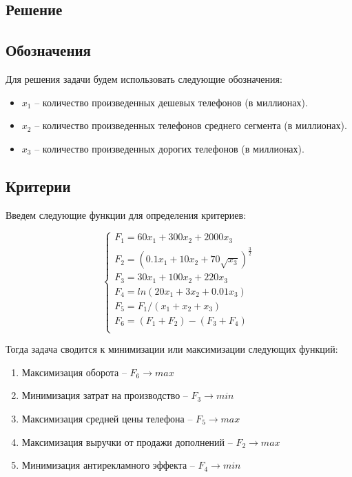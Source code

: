 \subsection{Решение}

\subsection{Обозначения}

Для решения задачи будем использовать следующие обозначения:

\begin{itemize}
	\item $x_1$ -- количество произведенных дешевых телефонов (в миллионах).
	\item $x_2$ -- количество произведенных телефонов среднего сегмента (в миллионах).
	\item $x_3$ -- количество произведенных дорогих телефонов (в миллионах).
\end{itemize}

\subsection{Критерии}

Введем следующие функции для определения критериев:

\begin{equation*}
\begin{cases}
\text{$F_1=60x_1+300x_2+2000x_3$} \\
\text{$F_2=(0.1x_1+10x_2+70\sqrt{x_3})^{\frac{3}{2}}$} \\
\text{$F_3=30x_1+100x_2+220x_3$} \\
\text{$F_4=ln(20x_1+3x_2+0.01x_3)$} \\
\text{$F_5=F_1/(x_1+x_2+x_3)$} \\
\text{$F_6=(F_1+F_2)-(F_3+F_4)$} \\
\end{cases}
\end{equation*}

Тогда задача сводится к минимизации или максимизации следующих функций:

\begin{enumerate}
	\item Максимизация оборота -- $F_6\rightarrow max$
	\item Минимизация затрат на производство -- $F_3\rightarrow min$
	\item Максимизация средней цены телефона -- $F_5\rightarrow max$
	\item Максимизация выручки от продажи дополнений -- $F_2\rightarrow max$
	\item Минимизация антирекламного эффекта -- $F_4\rightarrow min$
\end{enumerate}

